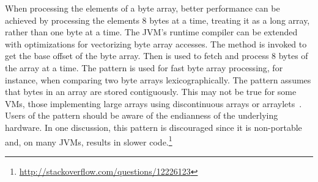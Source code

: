 \newcommand\foundinprobyte{44}
\newcommand\usedbyprobyte{12274}
\newcommand\mostusedprobyte{\probytemost}
\newcommand\membersprobyte{\member{array\-Base\-Offset}, \member{getLong}, and optionally \member{array\-Index\-Scale} (to assert that the size of byte is equal to 1)}
\newcommand\nameprobyte{Process Byte Arrays in Block}

%
{When processing the elements of a byte array, better performance
can be achieved by processing the elements 8 bytes at a time, treating it as a
long array, rather than one byte at a time.}
{The JVM's runtime compiler can be extended with optimizations for vectorizing
byte array accesses.}
{The  method is invoked to get the base offset of the byte array.
Then  is used to fetch and process 8 bytes of the array at a time.}
{The pattern is used for fast byte array processing, for instance,
when comparing two byte arrays lexicographically.}
{The pattern assumes that bytes in an array are stored contiguously. This may
  not be true for some VMs, \eg{} those implementing large arrays using
  discontinuous arrays or
  arraylets~\cite{siebertEliminatingExternalFragmentation2000,baconRealtimeGarbageCollector2003}. Users of
the pattern should be aware of the endianness of the underlying hardware.
In one \stackoverflow{} discussion, this pattern is
discouraged since it is non-portable and, on many JVMs, results in slower
code.\footnote{\url{http://stackoverflow.com/questions/12226123}} }

\newcommand\foundinlockfree{84}
\newcommand\usedbylockfree{10259}
\newcommand\mostusedlockfree{\lockfreemost}
\newcommand\memberslockfree{Either \member{object\-Field\-Offset} or \member{array\-Base\-Offset} in conjunction
  with \member{array\-Index\-Scale}, plus methods of the \smugroup{CAS} group
or the \smugroup{Fetch \& Add} group.
}
\newcommand\namelockfree{Atomic Operations}



